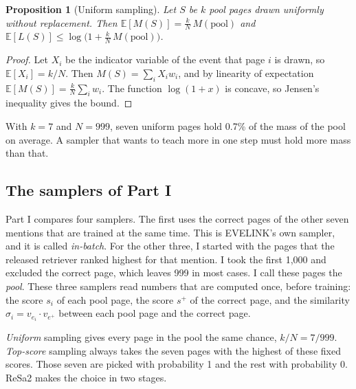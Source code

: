 \documentclass[11pt]{article}
\newtheorem{proposition}{Proposition}
\theoremstyle{definition}
\begin{document}
\begin{proposition}[Uniform sampling]
\label{prop:unif}
Let $S$ be $k$ pool pages drawn uniformly without replacement. Then $\mathbb{E}[M(S)] = \frac{k}{N}\, M(\mathrm{pool})$ and $\mathbb{E}[L(S)] \le \log\bigl(1 + \frac{k}{N}\, M(\mathrm{pool})\bigr)$.
\end{proposition}
\begin{proof}
Let $X_i$ be the indicator variable of the event that page $i$ is drawn, so $\mathbb{E}[X_i] = k/N$. Then $M(S) = \sum_i X_i w_i$, and by linearity of expectation $\mathbb{E}[M(S)] = \frac{k}{N} \sum_i w_i$. The function $\log(1 + x)$ is concave, so Jensen's inequality gives the bound.
\end{proof}

With $k = 7$ and $N = 999$, seven uniform pages hold 0.7\% of the mass of the pool on average. A sampler that wants to teach more in one step must hold more mass than that.

\subsection{The samplers of Part I}
\label{sec:samplers}

Part I compares four samplers. The first uses the correct pages of the other seven mentions that are trained at the same time. This is EVELINK's own sampler, and it is called \emph{in-batch}. For the other three, I started with the pages that the released retriever ranked highest for that mention. I took the first 1,000 and excluded the correct page, which leaves 999 in most cases. I call these pages the \emph{pool}. These three samplers read numbers that are computed once, before training: the score $s_i$ of each pool page, the score $s^{+}$ of the correct page, and the similarity $\sigma_i = v_{e_i} \cdot v_{e^{+}}$ between each pool page and the correct page.

\emph{Uniform} sampling gives every page in the pool the same chance, $k/N = 7/999$. \emph{Top-score} sampling always takes the seven pages with the highest of these fixed scores. Those seven are picked with probability 1 and the rest with probability 0. ReSa2 makes the choice in two stages.
\end{document}
